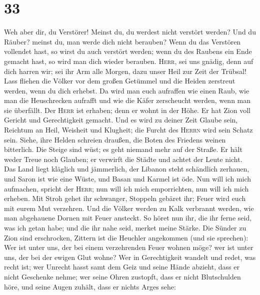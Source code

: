 \hypertarget{section-32}{%
\section{33}\label{section-32}}

 Weh aber dir, du Verstörer! Meinst du, du werdest nicht
verstört werden? Und du Räuber? meinst du, man werde dich nicht
berauben? Wenn du das Verstören vollendet hast, so wirst du auch
verstört werden; wenn du des Raubens ein Ende gemacht hast, so wird man
dich wieder berauben.  \textsc{Herr}, sei uns gnädig, denn
auf dich harren wir; sei ihr Arm alle Morgen, dazu unser Heil zur Zeit
der Trübsal!  Lass fliehen die Völker vor dem großen
Getümmel und die Heiden zerstreut werden, wenn du dich erhebst.
 Da wird man euch aufraffen wie einen Raub, wie man die
Heuschrecken aufrafft und wie die Käfer zerscheucht werden, wenn man sie
überfällt.  Der \textsc{Herr} ist erhaben; denn er wohnt
in der Höhe. Er hat Zion voll Gericht und Gerechtigkeit gemacht.
 Und es wird zu deiner Zeit Glaube sein, Reichtum an Heil,
Weisheit und Klugheit; die Furcht des \textsc{Herrn} wird sein Schatz
sein.  Siehe, ihre Helden schreien draußen, die Boten des
Friedens weinen bitterlich.  Die Steige sind wüst; es geht
niemand mehr auf der Straße. Er hält weder Treue noch Glauben; er
verwirft die Städte und achtet der Leute nicht.  Das Land
liegt kläglich und jämmerlich, der Libanon steht schändlich zerhauen,
und Saron ist wie eine Wüste, und Basan und Karmel ist öde.
 Nun will ich mich aufmachen, spricht der \textsc{Herr};
nun will ich mich emporrichten, nun will ich mich erheben.
 Mit Stroh gehet ihr schwanger, Stoppeln gebäret ihr;
Feuer wird euch mit eurem Mut verzehren.  Und die Völker
werden zu Kalk verbrannt werden, wie man abgehauene Dornen mit Feuer
ansteckt.  So höret nun ihr, die ihr ferne seid, was ich
getan habe; und die ihr nahe seid, merket meine Stärke. 
Die Sünder zu Zion sind erschrocken, Zittern ist die Heuchler angekommen
(und sie sprechen): Wer ist unter uns, der bei einem verzehrenden Feuer
wohnen möge? wer ist unter uns, der bei der ewigen Glut wohne?
 Wer in Gerechtigkeit wandelt und redet, was recht ist;
wer Unrecht hasst samt dem Geiz und seine Hände abzieht, dass er nicht
Geschenke nehme; wer seine Ohren zustopft, dass er nicht Blutschulden
höre, und seine Augen zuhält, dass er nichts Arges sehe: 
